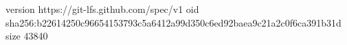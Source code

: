 version https://git-lfs.github.com/spec/v1
oid sha256:b22614250c96654153793c5a6412a99d350c6ed92baea9c21a2c0f6ca391b31d
size 43840
